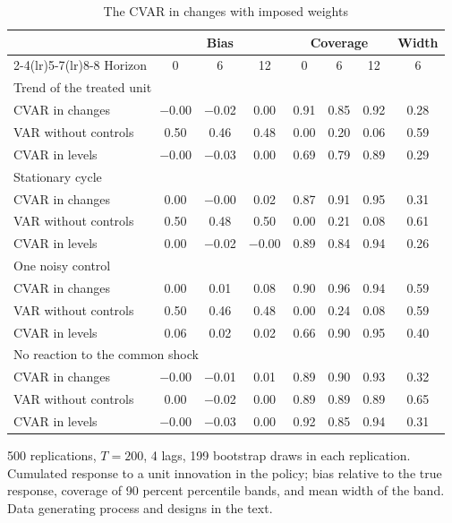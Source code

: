 \begin{table}[htbp]
\centering
\caption{The CVAR in changes with imposed weights\label{tab:mc-diff}}
\small
\begin{tabular}{lccccccc}
\toprule
 & \multicolumn{3}{c}{Bias} & \multicolumn{3}{c}{Coverage} & Width \\
\cmidrule(lr){2-4}\cmidrule(lr){5-7}\cmidrule(lr){8-8}
Horizon & 0 & 6 & 12 & 0 & 6 & 12 & 6 \\
\midrule
\multicolumn{8}{l}{Trend of the treated unit} \\
CVAR in changes & $-$0.00 & $-$0.02 & 0.00 & 0.91 & 0.85 & 0.92 & 0.28 \\
VAR without controls & 0.50 & 0.46 & 0.48 & 0.00 & 0.20 & 0.06 & 0.59 \\
CVAR in levels & $-$0.00 & $-$0.03 & 0.00 & 0.69 & 0.79 & 0.89 & 0.29 \\
\midrule
\multicolumn{8}{l}{Stationary cycle} \\
CVAR in changes & 0.00 & $-$0.00 & 0.02 & 0.87 & 0.91 & 0.95 & 0.31 \\
VAR without controls & 0.50 & 0.48 & 0.50 & 0.00 & 0.21 & 0.08 & 0.61 \\
CVAR in levels & 0.00 & $-$0.02 & $-$0.00 & 0.89 & 0.84 & 0.94 & 0.26 \\
\midrule
\multicolumn{8}{l}{One noisy control} \\
CVAR in changes & 0.00 & 0.01 & 0.08 & 0.90 & 0.96 & 0.94 & 0.59 \\
VAR without controls & 0.50 & 0.46 & 0.48 & 0.00 & 0.24 & 0.08 & 0.59 \\
CVAR in levels & 0.06 & 0.02 & 0.02 & 0.66 & 0.90 & 0.95 & 0.40 \\
\midrule
\multicolumn{8}{l}{No reaction to the common shock} \\
CVAR in changes & $-$0.00 & $-$0.01 & 0.01 & 0.89 & 0.90 & 0.93 & 0.32 \\
VAR without controls & 0.00 & $-$0.02 & 0.00 & 0.89 & 0.89 & 0.89 & 0.65 \\
CVAR in levels & $-$0.00 & $-$0.03 & 0.00 & 0.92 & 0.85 & 0.94 & 0.31 \\
\bottomrule
\end{tabular}
\par\smallskip\parbox{0.95\textwidth}{\footnotesize 500 replications, $T=200$, 4 lags, 199 bootstrap draws in each replication. Cumulated response to a unit innovation in the policy; bias relative to the true response, coverage of 90 percent percentile bands, and mean width of the band. Data generating process and designs in the text.}
\end{table}
